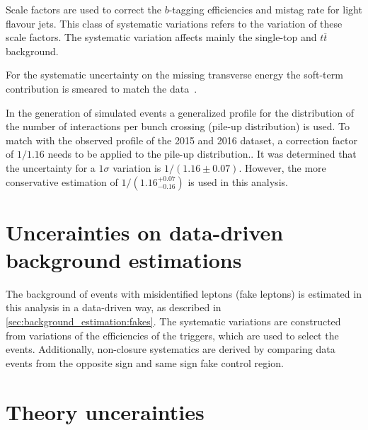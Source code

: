\begin{description}[leftmargin=0cm]
    \item[b-tagging:] Scale factors are used to correct the $b$-tagging efficiencies and mistag rate for light flavour jets.
        This class of systematic variations refers to the variation of these scale factors.
        The systematic variation affects mainly the single-top and $t\overline{t}$ background.
    \item[Transverse missing energy:] For the systematic uncertainty on the missing transverse energy the soft-term
        contribution is smeared to match the data~\cite{METUncertainty}.
    \item[Pile-up reweighting:] In the generation of simulated events a generalized profile for the distribution of the number of interactions
        per bunch crossing (pile-up distribution) is used. To match with the observed profile of the 2015 and 2016 dataset, a correction factor
        of $1/1.16$ needs to be applied to the pile-up distribution..
        It was determined that the uncertainty for a $1\sigma$ variation is $1/(1.16 \pm 0.07)$.
        However, the more conservative estimation of $1/(1.16^{+0.07}_{-0.16})$ is used in this analysis.
\end{description}

\section{Uncerainties on data-driven background estimations}\label{sec:systematics:bkg}

The background of events with misidentified leptons (fake leptons) is estimated in this analysis in a data-driven way,
as described in \cref{sec:background_estimation:fakes}.
The systematic variations are constructed from variations of the efficiencies of the triggers, which are used to select the events.
Additionally, non-closure systematics are derived by comparing data events from the opposite sign and same sign fake control region.

\section{Theory uncerainties}\label{sec:systematics:theo}

